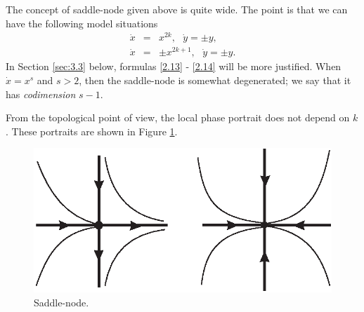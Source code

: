 \begin{remark}
	The concept of saddle-node given above is quite wide. The point is that we can have the following model situations
	\begin{eqnarray}
	\dot{x} &=&x^{2k},\text{ \ \ }\dot{y}=\pm y,  \label{2.13} \\
	\dot{x} &=&\pm x^{2k+1},\text{\ \ \ }\dot{y}=\pm y.  \label{2.14}
	\end{eqnarray}
	In Section \ref{sec:3.3} below, formulas \eqref{2.13} - \eqref{2.14} will be more justified. When $\dot{x}=x^{s}$ and $ s>2$, then the saddle-node is somewhat degenerated; we say that it has \textit{codimension} $s-1$.
	
	From the topological point of view, the local phase portrait does not depend on $ k$. These portraits are shown in Figure \ref{fig:2.18}.
	
	\begin{figure}[!ht]
		\centering
		\includegraphics [scale=1]{jtr218}
		\caption{Saddle-node.}
		\label{fig:2.18}
	\end{figure}
\end{remark}

